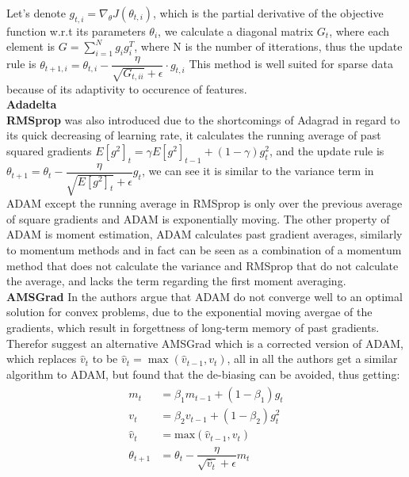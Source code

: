 \documentclass[10pt,a4paper]{article}
\begin{document}
Let's denote $g_{t, i} = \nabla_\theta J( \theta_{t, i} )$, which is the partial derivative of the objective function w.r.t its parameters $\theta_i$, we calculate a diagonal matrix $G_t$, where each element is $G=\sum_{i=1}^{N} g_i g_i^T$, where N is the number of itterations, thus the update rule is $\theta_{t+1, i} = \theta_{t, i} - \dfrac{\eta}{\sqrt{G_{t, ii}} + \epsilon} \cdot g_{t, i}$
This method is well suited for sparse data because of its adaptivity to occurence of features.
\\
\textbf{Adadelta} 
\\
\textbf{RMSprop} was also introduced due to the shortcomings of Adagrad in regard to its quick decreasing of learning rate, it calculates the running average of past squared gradients $E[g^2]_t = \gamma E[g^2]_{t-1} + (1 - \gamma) g^2_t$, and the update rule is $\theta_{t+1} = \theta_{t} - \dfrac{\eta}{\sqrt{E[g^2]_t} + \epsilon} g_{t}$, we can see it is similar to the variance term in ADAM except the running average in RMSprop is only over the previous average of square gradients and ADAM is exponentially moving.
The other property of ADAM is moment estimation, ADAM calculates past gradient averages, similarly to momentum methods and in fact can be seen as a combination of a momentum method that does not calculate the variance and RMSprop that do not calculate the average, and lacks the term regarding the first moment averaging.\\
\textbf{AMSGrad} In \cite{reddi2019convergence} the authors argue that ADAM do not converge well to an optimal solution for convex problems, due to the exponential moving avergae of the gradients, which result in forgettness of long-term memory of past gradients. Therefor suggest an alternative AMSGrad which is a corrected version of ADAM, which replaces $\hat{v}_t$ to be $\hat{v}_t = \max(\hat{v}_{t-1}, v_t)$, all in all the authors get a similar algorithm to ADAM, but found that the de-biasing can be avoided, thus getting:
\begin{align} 
    \begin{split} 
    m_t &= \beta_1 m_{t-1} + (1 - \beta_1) g_t \\ 
    v_t &= \beta_2 v_{t-1} + (1 - \beta_2) g_t^2\\ 
    \hat{v}_t &= \text{max}(\hat{v}_{t-1}, v_t) \\ 
    \theta_{t+1} &= \theta_{t} - \dfrac{\eta}{\sqrt{\hat{v}_t} + \epsilon} m_t 
    \end{split} 
\end{align}
    
\end{document}
